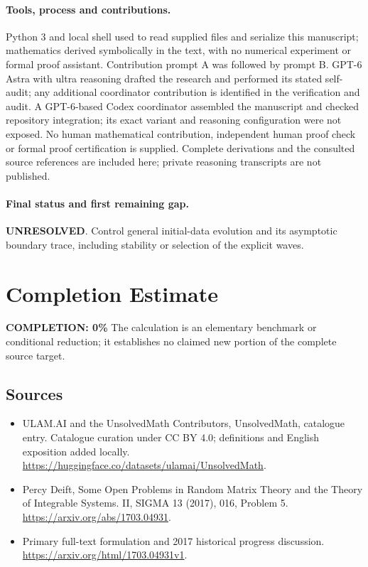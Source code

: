 \documentclass[11pt]{article}
\begin{document}
\paragraph{Tools, process and contributions.}
Python 3 and local shell used to read supplied files and serialize this manuscript; mathematics derived symbolically in the text, with no numerical experiment or formal proof assistant. Contribution prompt A was followed by prompt B. GPT-6 Astra with ultra reasoning drafted the research and performed its stated self-audit; any additional coordinator contribution is identified in the verification and audit. A GPT-6-based Codex coordinator assembled the manuscript and checked repository integration; its exact variant and reasoning configuration were not exposed. No human mathematical contribution, independent human proof check or formal proof certification is supplied. Complete derivations and the consulted source references are included here; private reasoning transcripts are not published.

\paragraph{Final status and first remaining gap.}
\textbf{UNRESOLVED}. Control general initial-data evolution and its asymptotic boundary trace, including stability or selection of the explicit waves.

\section{Completion Estimate}
\noindent\textbf{COMPLETION: 0\%}
The calculation is an elementary benchmark or conditional reduction; it establishes no claimed new portion of the complete source target.

\subsection{Sources}
\begin{itemize}
\item[\hypertarget{source:statement:1}{S1}] ULAM.AI and the UnsolvedMath Contributors, UnsolvedMath, catalogue entry. Catalogue curation under CC BY 4.0; definitions and English exposition added locally.
\url{https://huggingface.co/datasets/ulamai/UnsolvedMath}.
\item[\hypertarget{source:statement:2}{S2}] Percy Deift, Some Open Problems in Random Matrix Theory and the Theory of Integrable Systems. II, SIGMA 13 (2017), 016, Problem 5.
\url{https://arxiv.org/abs/1703.04931}.
\item[\hypertarget{source:statement:3}{S3}] Primary full-text formulation and 2017 historical progress discussion.
\url{https://arxiv.org/html/1703.04931v1}.
\end{itemize}
\label{end:statement}
\end{document}
